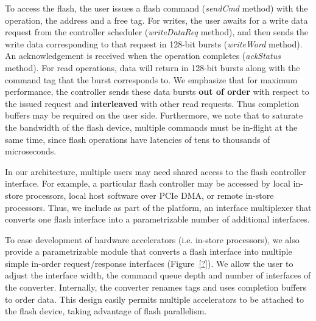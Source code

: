 To access the flash, the user issues a flash command
(\textit{sendCmd} method) with the operation, the address and
a free tag. For writes, the user awaits for a write data request from
the controller scheduler (\textit{writeDataReq} method), and then sends
the write data corresponding to that request in 128-bit bursts
(\textit{writeWord} method). An acknowledgement is received when the
operation completes (\textit{ackStatus} method). For read operations,
data will return in 128-bit bursts along with the command tag that the
burst corresponds to. We emphasize that for maximum performance, the
controller sends these data bursts \textbf{out of order} with respect to
the issued request and \textbf{interleaved} with other read requests.
Thus completion buffers may be required on the user side. Furthermore,
we note that to saturate the bandwidth of the flash device, multiple
commands must be in-flight at the same time, since flash operations
have latencies of tens to thousands of microseconds. 

In our architecture, multiple users may need shared access to the
flash controller interface. For example, a particular flash controller may
be accessed by local in-store processors, local host software over PCIe
DMA, or remote in-store processors. Thus, we include as part of the
platform, an interface multiplexer that converts one flash interface
into a parametrizable number of additional interfaces. 

To ease development of hardware accelerators (i.e. in-store processors),
we also provide a parametrizable module that converts a flash interface
into multiple simple in-order request/response interfaces
(Figure~\ref{?}). We allow the user to adjust the interface width, the
command queue depth and number of interfaces of the converter.
Internally, the converter renames tags and uses completion buffers to
order data. This design easily permits multiple accelerators to be
attached to the flash device, taking advantage of flash parallelism. 


